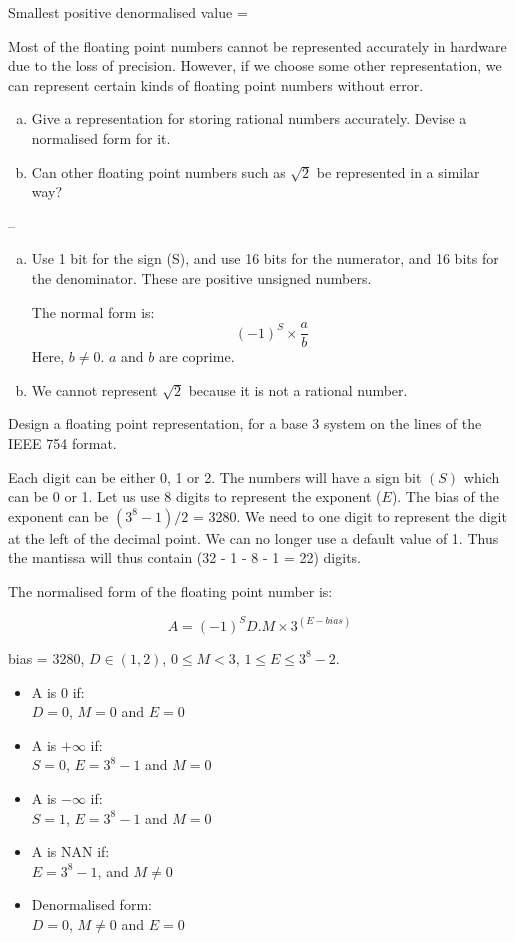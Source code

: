 \begin{ExerciseList}
\begin{enumerate}[a) ]
Smallest positive denormalised value = 
\end{enumerate}


\Exercise[difficulty=1]
Most of the floating point numbers cannot be represented accurately in hardware due to
 the loss of precision. However, if we choose some other representation, we can 
represent certain kinds of floating point numbers without error.

\begin{enumerate}[a) ]
\item Give a representation for storing rational numbers accurately.
Devise a normalised form for it. 

\item Can other floating point numbers such as $\sqrt{2}$  be represented in a similar way?
\end{enumerate}

\Answer  --

\begin{enumerate}[a) ]
\item
Use 1 bit for the sign (S), and use 16 bits for the numerator, and 16 bits for the denominator. These are 
positive unsigned numbers. 

The normal form is: 
\[
	(-1)^S \times \frac{a}{b} 
\]
Here, $b \ne 0$. $a$ and $b$ are coprime.

\item
We cannot represent $\sqrt{2}$ because it is not a rational number.
\end{enumerate}

\Exercise 
Design a floating point representation, for a base 3 system on the lines of the IEEE 754 format.

\Answer
Each digit can be either 0, 1 or 2. The numbers will have a sign bit $(S)$ which can be 0 or 1.
Let us use 8 digits to represent the exponent ($E$). The bias of the exponent can be $(3^8 - 1)/2$ = 3280.
We need to one digit to represent the digit at the left of the decimal point. We can no longer use
a default value of 1. Thus the mantissa will thus contain (32 - 1 - 8 - 1 = 22) digits.

The normalised form of the  floating point number is:

\[
A = (-1)^S D.M \times 3^{(E - bias)}
\]

bias = 3280, $D \in (1,2)$, $0 \le M < 3$, $1 \le E \le 3^8 - 2$. 

\begin{itemize}
\item
A is 0 if:\\
$D=0$, $M=0$ and $E=0$
\item
A is $+\infty$ if:\\
$S=0$,  $E=3^8-1$ and $M=0$
\item
A is $-\infty$ if:\\
$S=1$,  $E=3^8-1$ and $M=0$
\item
A is NAN if: \\
$E = 3^8 - 1$, and $M \ne 0$
\item
Denormalised form:\\
$D=0$, $M \ne 0$ and $E=0$
\end{itemize}


\end{ExerciseList}
